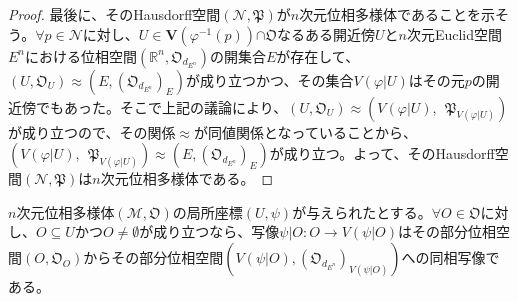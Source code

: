 \documentclass[dvipdfmx]{jsarticle}
\begin{document}
\begin{proof}
最後に、そのHausdorff空間$\left( \mathcal{N},\mathfrak{P} \right)$が$n$次元位相多様体であることを示そう。$\forall p \in \mathcal{N}$に対し、$U \in \mathbf{V}\left( \varphi^{- 1}(p) \right)\mathfrak{\cap O}$なるある開近傍$U$と$n$次元Euclid空間$E^{n}$における位相空間$\left( \mathbb{R}^{n},\mathfrak{O}_{d_{E^{n}}} \right)$の開集合$E$が存在して、$\left( U,\mathfrak{O}_{U} \right) \approx \left( E,\left( \mathfrak{O}_{d_{E^{n}}} \right)_{E} \right)$が成り立つかつ、その集合$V\left( \varphi|U \right)$はその元$p$の開近傍でもあった。そこで上記の議論により、$\left( U,\mathfrak{O}_{U} \right) \approx \left( V\left( \varphi|U \right),\ \ \mathfrak{P}_{V\left( \varphi|U \right)} \right)$が成り立つので、その関係$\approx$が同値関係となっていることから、$\left( V\left( \varphi|U \right),\ \ \mathfrak{P}_{V\left( \varphi|U \right)} \right) \approx \left( E,\left( \mathfrak{O}_{d_{E^{n}}} \right)_{E} \right)$が成り立つ。よって、そのHausdorff空間$\left( \mathcal{N},\mathfrak{P} \right)$は$n$次元位相多様体である。
\end{proof}
\begin{thm}\label{8.3.1.5}
$n$次元位相多様体$\left( \mathcal{M},\mathfrak{O} \right)$の局所座標$(U,\psi)$が与えられたとする。$\forall O \in \mathfrak{O}$に対し、$O \subseteq U$かつ$O \neq \emptyset$が成り立つなら、写像$\psi|O:O \rightarrow V\left( \psi|O \right)$はその部分位相空間$\left( O,\mathfrak{O}_{O} \right)$からその部分位相空間$\left( V\left( \psi|O \right), \left( \mathfrak{O}_{d_{E^{n}}} \right)_{V\left( \psi|O \right)} \right)$への同相写像である。
\end{thm}
\end{document}
